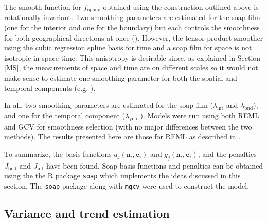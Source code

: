 The smooth function for $f_\texttt{space}$ obtained using the construction outlined above is rotationally invariant. Two smoothing parameters are estimated for the soap film (one for the interior and one for the boundary) but each controls the smoothness for both geographical directions at once (\cite{soap}). However, the tensor product smoother using the cubic regression spline basis for time and a soap film for space is not isotropic in space-time. This anisotropy is desirable since, as explained in Section \ref{MS}, the measurements of space and time are on different scales so it would not make sense to estimate one smoothing parameter for both the spatial and temporal components (e.g. \cite[p. 162]{simonbook}).
 
 In all, two smoothing parameters are estimated for the soap film ($\lambda_\text{int}$ and $\lambda_\text{bnd}$), and one for the temporal component ($\lambda_\texttt{year}$). Models were run using both REML and GCV for smoothness selection (with no major differences between the two methods). The results presented here are those for REML as described in .
 
To summarize, the basis functions $a_j(\texttt{n}_i,\texttt{e}_i)$ and $g_j(\texttt{n}_i,\texttt{e}_i)$, and the penalties $J_\text{bnd}$ and $J_\text{int}$ have been found. Soap basis functions and penalties can be obtained using the the \textsf{R} package \texttt{soap} which implements the ideas discussed in this section. The \texttt{soap} package along with \texttt{mgcv} were used to construct the model\label{cor-r22}.

\subsection{Variance and trend estimation \label{VE}}

